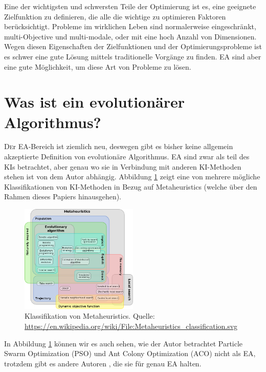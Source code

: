 \documentclass[twoside,twocolumn]{article}
\begin{document}
Eine der wichtigsten und schwersten Teile der Optimierung ist es, eine geeignete Zielfunktion zu definieren, die alle die wichtige zu optimieren Faktoren berücksichtigt.
Probleme im wirklichen Leben sind normalerweise eingeschränkt, multi-Objective und multi-modale, oder mit eine hoch Anzahl von Dimensionen. Wegen diesen Eigenschaften der Zielfunktionen und der Optimierungsprobleme ist es schwer eine gute Lösung mittels traditionelle Vorgänge  zu finden. EA sind aber eine gute Möglichkeit, um diese Art von Probleme zu lösen.


\section{Was ist ein evolutionärer Algorithmus?}

\lettrine[nindent=0em,lines=3]{D} er EA-Bereich ist ziemlich neu, deswegen gibt es bisher keine allgemein akzeptierte Definition von evolutionäre Algorithmus. EA sind zwar als teil des KIs betrachtet, aber genau wo sie in Verbindung mit anderen KI-Methoden stehen ist von dem Autor abhängig. Abbildung \ref{fig:metaheuristics} zeigt eine von mehrere mögliche Klassifikationen von KI-Methoden in Bezug auf Metaheuristics (welche über den Rahmen dieses Papiers hinausgehen).\\

\begin{figure}[h]
\caption{ Klassifikation von Metaheuristics. Quelle: \url{https://en.wikipedia.org/wiki/File:Metaheuristics_classification.svg}}
\label{fig:metaheuristics}
\centering
\includegraphics[width=0.5\textwidth]{images/metaheuristics_classification.png}
\end{figure}

In Abbildung \ref{fig:metaheuristics} können wir es auch sehen, wie der Autor betrachtet Particle Swarm Optimization (PSO) und Ant Colony Optimization (ACO) nicht als EA, trotzdem gibt es andere Autoren \cite{wiley_evolutionary}, die sie für genau EA halten.
\end{document}
